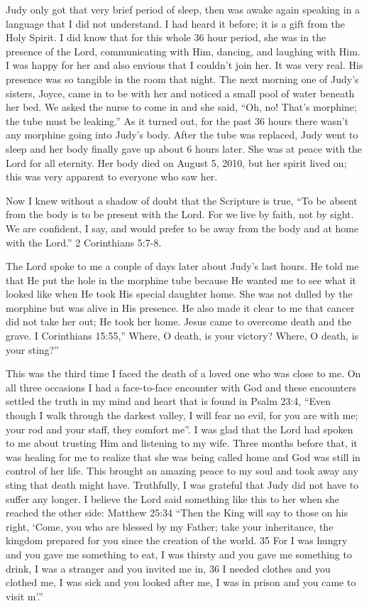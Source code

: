 \documentclass[oneside]{book}
\begin{document}
Judy only got that very  brief period of sleep, then was awake again speaking in a language that I did not understand. I had heard it before; it is a gift from the Holy Spirit. I did know that for this whole 36 hour period, she was in the presence of the Lord, communicating with Him, dancing, and laughing with Him. I was happy for her and also envious that I couldn’t join her. It was very real. His presence was so tangible in the room that night. The next morning one of Judy’s sisters, Joyce, came in to be with her and noticed a small pool of water beneath her bed. We asked the nurse to come in and she said, “Oh, no! That’s morphine; the tube must be leaking.” As it turned out, for the past 36 hours there wasn’t any morphine going into Judy’s body. After the tube was replaced, Judy went to sleep and her body finally gave up about 6 hours later. She was at peace with the Lord for all eternity. Her body died on August 5, 2010, but her spirit lived on; this was very apparent to everyone who saw her.

Now I knew without a shadow of doubt that the Scripture is true, “To be absent from the body is to be present with the Lord. For we live by faith, not by sight. We are confident, I say, and would prefer to be away from the body and at home with the Lord.” 2 Corinthians 5:7-8.

The Lord spoke to me a couple of days later about Judy’s last hours. He told me that He put the hole in the morphine tube because He wanted me to see what it looked like when He took His special daughter home. She was not dulled by the morphine but was alive in His presence. He also made it clear to me that cancer did not take her out; He took her home. Jesus came to overcome death and the grave. I Corinthians 15:55,” Where, O death, is your victory? Where, O death, is your sting?”

This was the third time I faced the death of a loved one who was close to me. On all three occasions I had a face-to-face encounter with God and these encounters settled the truth in my mind and heart that is found in Psalm 23:4, “Even though I walk through the darkest valley, I will fear no evil, for you are with me; your rod and your staff, they comfort me”. I was glad that the Lord had spoken to me about trusting Him and listening to my wife. Three months before that, it was healing for me to realize that she was being called home and God was still in control of her life. This brought an amazing peace to my soul and took away any sting that death might have. Truthfully, I was grateful that Judy did not have to suffer any longer. I believe the Lord said something like this to her when she reached the other side:  Matthew 25:34 “Then the King will say to those on his right, ‘Come, you who are blessed by my Father; take your inheritance, the kingdom prepared for you since the creation of the world. 35 For I was hungry and you gave me something to eat, I was thirsty and you gave me something to drink, I was a stranger and you invited me in, 36 I needed clothes and you clothed me, I was sick and you looked after me, I was in prison and you came to visit m’.” 
\end{document}
